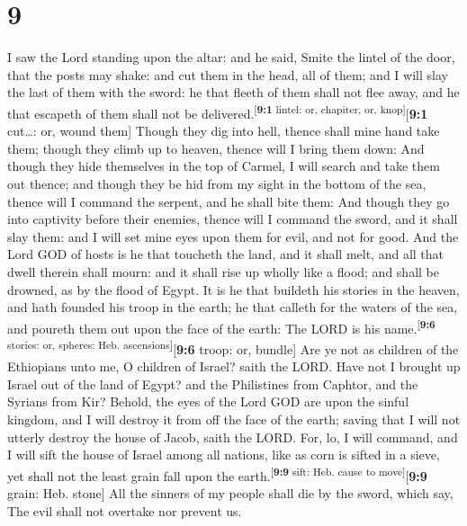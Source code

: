 \hypertarget{section-8}{%
\section{9}\label{section-8}}

 I saw the Lord standing upon the altar: and he said,
Smite the lintel of the door, that the posts may shake: and cut them in
the head, all of them; and I will slay the last of them with the sword:
he that fleeth of them shall not flee away, and he that escapeth of them
shall not be delivered.\textsuperscript{{[}\textbf{9:1} lintel: or,
chapiter, or, knop{]}}{[}\textbf{9:1} cut\ldots: or, wound them{]}
 Though they dig into hell, thence shall mine hand take
them; though they climb up to heaven, thence will I bring them down:
 And though they hide themselves in the top of Carmel, I
will search and take them out thence; and though they be hid from my
sight in the bottom of the sea, thence will I command the serpent, and
he shall bite them:  And though they go into captivity
before their enemies, thence will I command the sword, and it shall slay
them: and I will set mine eyes upon them for evil, and not for good.
 And the Lord GOD of hosts is he that toucheth the land,
and it shall melt, and all that dwell therein shall mourn: and it shall
rise up wholly like a flood; and shall be drowned, as by the flood of
Egypt.  It is he that buildeth his stories in the heaven,
and hath founded his troop in the earth; he that calleth for the waters
of the sea, and poureth them out upon the face of the earth: The LORD is
his name.\textsuperscript{{[}\textbf{9:6} stories: or, spheres: Heb.
ascensions{]}}{[}\textbf{9:6} troop: or, bundle{]}  Are ye
not as children of the Ethiopians unto me, O children of Israel? saith
the LORD. Have not I brought up Israel out of the land of Egypt? and the
Philistines from Caphtor, and the Syrians from Kir? 
Behold, the eyes of the Lord GOD are upon the sinful kingdom, and I will
destroy it from off the face of the earth; saving that I will not
utterly destroy the house of Jacob, saith the LORD.  For,
lo, I will command, and I will sift the house of Israel among all
nations, like as corn is sifted in a sieve, yet shall not the least
grain fall upon the earth.\textsuperscript{{[}\textbf{9:9} sift: Heb.
cause to move{]}}{[}\textbf{9:9} grain: Heb. stone{]} 
All the sinners of my people shall die by the sword, which say, The evil
shall not overtake nor prevent us.

